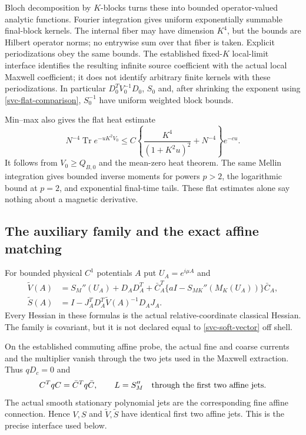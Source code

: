 \documentclass[11pt]{article}
\theoremstyle{remark}
\begin{document}
Bloch decomposition by $K$-blocks turns these into bounded
operator-valued analytic functions. Fourier integration gives uniform
exponentially summable final-block kernels. The internal fiber may
have dimension $K^4$, but the bounds are Hilbert operator norms; no
entrywise sum over that fiber is taken. Explicit periodizations obey the same bounds. The established fixed-$K$ local-limit interface identifies the resulting infinite source coefficient with the actual local Maxwell coefficient; it does not identify arbitrary finite kernels with these periodizations. In particular $D_0^TV_0^{-1}D_0$, $S_0$ and, after shrinking
the exponent using \eqref{svc-flat-comparison}, $S_0^{-1}$ have uniform
weighted block bounds.

Min--max also gives the flat heat estimate
\begin{equation}
 N^{-4}\operatorname{Tr}e^{-uK^2V_0}
 \le C\left\{\frac{K^4}{(1+K^2u)^2}+N^{-4}\right\}e^{-cu}.
 \label{svc-flat-heat}
\end{equation}
It follows from $V_0\ge Q_{B,0}$ and the mean-zero heat theorem.
The same Mellin integration gives bounded inverse moments for powers
$p>2$, the logarithmic bound at $p=2$, and exponential final-time tails.
These flat estimates alone say nothing about a magnetic derivative.

\subsection{The auxiliary family and the exact affine matching}
\label{svc-auxiliary-section}

For bounded physical $C^1$ potentials $A$ put $U_A=e^{i\mu A}$ and
\begin{align}
 \widetilde V(A)
  &=S_M''(U_A)+D_AD_A^T
       +\bar C_A^T\{aI-S_{MK}''(M_K(U_A))\}\bar C_A,
       \label{svc-auxiliary-vector}\\
 \widetilde S(A)
  &=I-J_A^TD_A^T\widetilde V(A)^{-1}D_AJ_A.
       \label{svc-auxiliary-coarse}
\end{align}
Every Hessian in these formulas is the actual relative-coordinate
classical Hessian. The family is covariant, but it is not declared equal
to \eqref{svc-soft-vector} off shell.

On the established commuting affine probe, the actual fine and coarse
currents and the multiplier vanish through the two jets used in the
Maxwell extraction. Thus $qD_c=0$ and
\begin{equation}
 C^TqC=\bar C^Tq\bar C,\qquad L=S_M''
 \quad\hbox{through the first two affine jets}.
 \label{svc-on-shell-match}
\end{equation}
The actual smooth stationary polynomial jets are the corresponding
fine affine connection. Hence $V,S$ and
$\widetilde V,\widetilde S$ have identical first two affine jets.
This is the precise interface used below.
\end{document}
